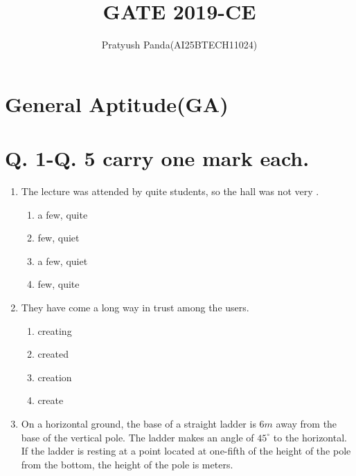 \documentclass[journal,12pt,onecolumn]{IEEEtran}
\theoremstyle{remark}
\begin{document}
\title{GATE 2019-CE}
\author{Pratyush Panda(AI25BTECH11024)}
\maketitle

\renewcommand{\thefigure}{\theenumi}
\renewcommand{\thetable}{\theenumi}

\section*{General Aptitude(GA)}
\section*{Q. 1-Q. 5 carry one mark each.}

\begin{enumerate}

\item The lecture was attended by quite \underline{\hspace{2cm}} students, so the hall was not very \underline{\hspace{2cm}}.

\hfill{}
\begin{enumerate}
\item a few, quite
\item few, quiet
\item a few, quiet
\item few, quite
\end{enumerate}

\item They have come a long way in \underline{\hspace{2cm}} trust among the users.

\hfill{}
\begin{enumerate}
\item creating
\item created
\item creation
\item create
\end{enumerate}

\item On a horizontal ground, the base of a straight ladder is $6m$ away from the base of the vertical pole. The ladder makes an angle of $45^\circ$ to the horizontal. If the ladder is resting at a point located at one-fifth of the height of the pole from the bottom, the height of the pole is \underline{\hspace{2cm}} meters.


\end{enumerate}
\end{document}
